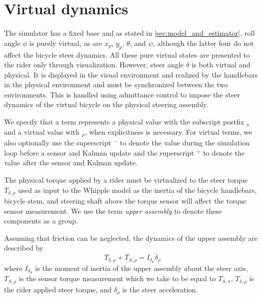 \documentclass{icsc2017a}
\newcommand{\x}{x_{p}}
\newcommand{\y}{y_{p}}
\newcommand{\pitch}{\theta}
\newcommand{\yaw}{\psi}
\newcommand{\roll}{\phi}
\newcommand{\steer}{\delta}
\newcommand{\steerAccel}{\ddot{\delta}}
\newcommand{\pre}{-}
\newcommand{\post}{+}
\newcommand{\virtual}{\rho}
\newcommand{\physical}{\pi}
\begin{document}
\section{Virtual dynamics}
The simulator has a fixed base and as stated in \autoref{sec:model_and_estimator}, roll angle $\roll$ is purely
virtual, as are $\x$, $\y$, $\pitch$, and $\yaw$, although the latter four do not affect the bicycle steer dynamics.
All these pure virtual states are presented to the rider only through visualization.
However, steer angle $\delta$ is both virtual and physical.
It is displayed in the visual environment and realized by the handlebars in the physical environment and must be
synchronized between the two environments.
This is handled using admittance control to impose the steer dynamics of the virtual bicycle on the physical steering
assembly.

We specify that a term represents a physical value with the subscript postfix $_\physical$ and a virtual value
with $_\virtual$, when explicitness is necessary.
For virtual terms, we also optionally use the superscript $^\pre$ to denote the value during the simulation loop
before a sensor and Kalman update and the superscript $^\post$ to denote the value after the sensor and Kalman
update.

The physical torque applied by a rider must be virtualized to the steer torque $T_{\steer,\virtual}$ used as input
to the Whipple model as the inertia of the bicycle handlebars, bicycle stem, and steering shaft above the torque
sensor will affect the torque sensor measurement.
We use the term \emph{upper assembly} to denote these components as a group.

Assuming that friction can be neglected, the dynamics of the upper assembly are described by
\begin{equation}
    T_{\steer,\virtual} + T_{S,\virtual} = I_{\steer_u} \steerAccel_\virtual \label{eq:eom_upper_assem}
\end{equation}
where $ I_{\steer_u}$ is the moment of inertia of the upper assembly about the steer axis,
$T_{S,\virtual}$ is the sensor torque measurement which we take to be equal to $T_{S,\physical}$,
$T_{\steer,\virtual}$ is the rider applied steer torque,
and $\steerAccel_\virtual$ is the steer acceleration.
\end{document}
